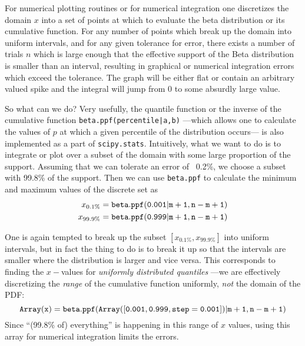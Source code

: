 \documentclass[letterpaper,12pt]{article}
\newcommand{\beq}{\begin{equation}} %
\newcommand{\eeq}{\end{equation}} %
\newcommand{\bdm}{\begin{displaymath}} %
\newcommand{\edm}{\end{displaymath}} %
\begin{document}
For numerical plotting routines or for numerical integration one
discretizes the domain \(x\) into a set of points at which to evaluate
the beta distribution or its cumulative function.  For any number of
points which break up the domain into uniform intervals, and for any
given tolerance for error, there exists a number of trials \(n\) which
is large enough that the effective support of the Beta distribution is
smaller than an interval, resulting in graphical or numerical
integration errors which exceed the tolerance. The graph will be
either flat or contain an arbitrary valued spike and the integral will
jump from \(0\) to some absurdly large value.

So what can we do? Very usefully, the quantile function or the inverse
of the cumulative function {\tt beta.ppf(percentile|a,b)} ---which
allows one to calculate the values of \(p\) at which a given
percentile of the distribution occurs--- is also implemented as a part
of {\tt scipy.stats}. Intuitively, what we want to do is to integrate
or plot over a subset of the domain with some large proportion of the
support. Assuming that we can tolerate an error of ~0.2\%, we choose a
subset with 99.8\% of the support. Then we can use {\tt beta.ppf} to
calculate the minimum and maximum values of the discrete set as
\beq
\begin{split}
  x_{0.1\%}&={\tt beta.ppf(0.001|m+1, n-m+1)}\\
  x_{99.9\%}&={\tt beta.ppf(0.999|m+1, n-m+1)}  
\end{split}
\eeq

One is again tempted to break up the subset
\([x_{0.1\%},x_{99.9\%}]\) into uniform intervals, but in fact the thing
to do is to break it up so that the intervals are smaller where the
distribution is larger and vice versa. This corresponds to finding the
\(x-\)values for {\em uniformly distributed quantiles} ---we are
effectively discretizing the {\em range} of the cumulative function
uniformly, {\em not} the domain of the PDF:
\bdm
{\tt Array(x)} = {\tt beta.ppf(Array([0.001, 0.999, step = 0.001])|m+1, n-m+1)}
\edm
Since ``(99.8\% of) everything'' is happening in this range of
\(x\) values, using this array for numerical integration limits the errors.
\end{document}
